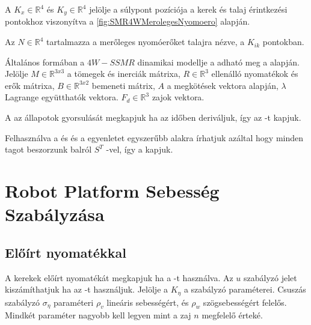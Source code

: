 A $K_x\in \mathbb{R}^4$ és $K_y\in \mathbb{R}^4$ jelölje a súlypont pozíciója a kerek és talaj érintkezési pontokhoz viszonyítva a \ref{fig:SMR4WMerolegesNyomoero} alapján.

Az $N \in \mathbb{R}^4$ tartalmazza a merőleges nyomóerőket talajra nézve, a $K_{ik}$ pontokban. 



Általános formában a $4W-SSMR$ dinamikai modellje a  adható meg a \cite{RobustMotionControl} alapján. Jelölje $M \in \mathbb{R}^{3x3}$ a tömegek és inerciák mátrixa, $R \in \mathbb{R}^{3}$ ellenálló nyomatékok és erők mátrixa,  $B \in \mathbb{R}^{3x2}$ bemeneti mátrix, $A$ a megkötések vektora  alapján, $\lambda$ Lagrange együtthatók vektora. $F_d \in \mathbb{R}^{3}$ zajok vektora.

A   az állapotok gyorsulását megkapjuk ha az  időben deriváljuk, így az -t kapjuk.

Felhasználva a   és  és  a  egyenletet egyszerűbb alakra írhatjuk azáltal hogy minden tagot beszorzunk balról $S^T$ -vel, így a  kapjuk.





\section{Robot Platform Sebesség Szabályzása}

\subsection{Előírt nyomatékkal}

A kerekek előírt nyomatékát megkapjuk ha a   -t használva. Az $u$ szabályzó jelet kiszámíthatjuk ha az -t használjuk. Jelölje a $K_\eta$ a szabályzó paraméterei. Csuszás szabályzó  $\sigma_\eta$ paraméteri $\rho_v$ lineáris sebességért, és $\rho_w$ szögsebességért felelős. Mindkét paraméter nagyobb kell legyen mint a zaj $n$ megfelelő érteké.

\renewcommand{\img}{SajatRobot/SzerkAbrak/SebContRefNyom.tex}
\renewcommand{\sources}{*}
\renewcommand{\captionn}{Kinematikai modell az $SSMR$ típusú $MR$ robotnak.}
\renewcommand{\figlabel}{DinamicSpeedController}




